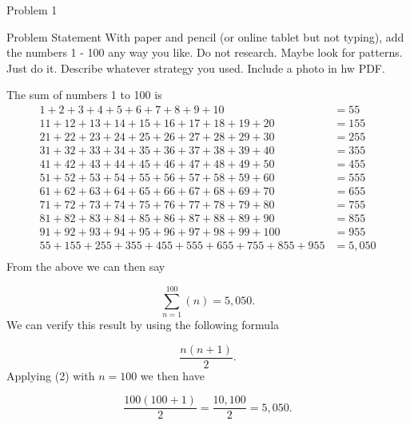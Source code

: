 \begin{problem}{Problem 1}
    \begin{statement}{Problem Statement}
        With paper and pencil (or online tablet but not typing), add the numbers 1 - 100 any way you like. Do not research. Maybe look for patterns. Just do it.  Describe whatever strategy you used. 
        Include a photo in hw PDF.
    \end{statement}

    \begin{highlight}[Solution]
        The sum of numbers 1 to 100 is
        \begin{align*}
            1 + 2 + 3 + 4 + 5 + 6 + 7 + 8 + 9 + 10 & = 55 \\
            11 + 12 + 13 + 14 + 15 + 16 + 17 + 18 + 19 + 20 & = 155 \\
            21 + 22 + 23 + 24 + 25 + 26 + 27 + 28 + 29 + 30 & = 255 \\
            31 + 32 + 33 + 34 + 35 + 36 + 37 + 38 + 39 + 40 & = 355 \\
            41 + 42 + 43 + 44 + 45 + 46 + 47 + 48 + 49 + 50 & = 455 \\
            51 + 52 + 53 + 54 + 55 + 56 + 57 + 58 + 59 + 60 & = 555 \\
            61 + 62 + 63 + 64 + 65 + 66 + 67 + 68 + 69 + 70 & = 655 \\
            71 + 72 + 73 + 74 + 75 + 76 + 77 + 78 + 79 + 80 & = 755 \\
            81 + 82 + 83 + 84 + 85 + 86 + 87 + 88 + 89 + 90 & = 855 \\
            91 + 92 + 93 + 94 + 95 + 96 + 97 + 98 + 99 + 100 & = 955 \\
            55 + 155 + 255 + 355 + 455 + 555 + 655 + 755 + 855 + 955 & = 5,050 \\
        \end{align*}
        From the above we can then say

        \setcounter{equation}{0}
        \begin{equation}
            \sum_{n = 1}^{100} (n) = 5,050.
        \end{equation}
        We can verify this result by using the following formula 

        \begin{equation}
            \frac{n(n + 1)}{2}.
        \end{equation}
        Applying (2) with $n = 100$ we then have

        \begin{equation}
            \frac{100(100 + 1)}{2} = \frac{10,100}{2} = 5,050.
        \end{equation}
    \end{highlight}

    
\end{problem}

